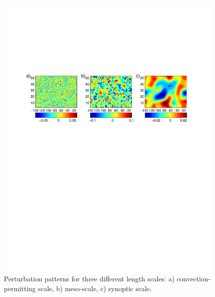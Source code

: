 \begin{figure}[h!]
  \includegraphics[trim=0cm 15cm 0 10cm,scale=.80]{figures/stoch_pattern.png}
    \caption{Perturbation patterns for three different length scales: a) convection-permitting scale, b) meso-scale, c) synoptic scale.}
  \label{fig_stoch_pattern}
\end{figure}
